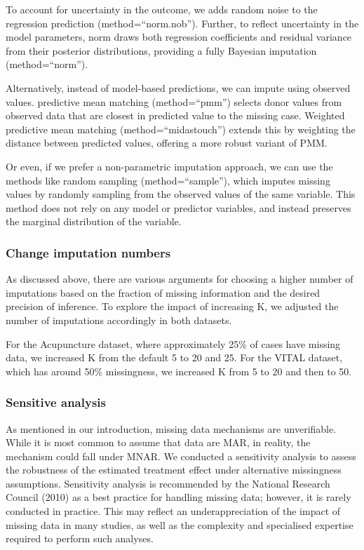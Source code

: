 \documentclass{article}
\begin{document}
To account for uncertainty in the outcome, we adds random noise to the
regression prediction (method=``norm.nob''). Further, to reflect
uncertainty in the model parameters, norm draws both regression
coefficients and residual variance from their posterior distributions,
providing a fully Bayesian imputation (method=``norm'').

Alternatively, instead of model-based predictions, we can impute using
observed values. predictive mean matching (method=``pmm'') selects donor
values from observed data that are closest in predicted value to the
missing case. Weighted predictive mean matching (method=``midastouch'')
extends this by weighting the distance between predicted values,
offering a more robust variant of PMM.

Or even, if we prefer a non-parametric imputation approach, we can use
the methods like random sampling (method=``sample''), which imputes
missing values by randomly sampling from the observed values of the same
variable. This method does not rely on any model or predictor variables,
and instead preserves the marginal distribution of the variable.

\subsubsection{Change imputation
numbers}\label{change-imputation-numbers}

As discussed above, there are various arguments for choosing a higher
number of imputations based on the fraction of missing information and
the desired precision of inference. To explore the impact of increasing
K, we adjusted the number of imputations accordingly in both datasets.

For the Acupuncture dataset, where approximately 25\% of cases have
missing data, we increased K from the default 5 to 20 and 25. For the
VITAL dataset, which has around 50\% missingness, we increased K from 5
to 20 and then to 50.

\subsubsection{Sensitive analysis}\label{sensitive-analysis}

As mentioned in our introduction, missing data mechanisms are
unverifiable. While it is most common to assume that data are MAR, in
reality, the mechanism could fall under MNAR. We conducted a sensitivity
analysis to assess the robustness of the estimated treatment effect
under alternative missingness assumptions. Sensitivity analysis is
recommended by the National Research Council (2010) as a best practice
for handling missing data; however, it is rarely conducted in practice.
This may reflect an underappreciation of the impact of missing data in
many studies, as well as the complexity and specialised expertise
required to perform such analyses.
\end{document}
